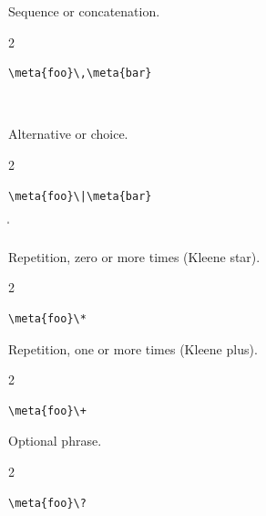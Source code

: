\documentclass{scrartcl}
\begin{document}
{\begin{definition}
\begin{description}
\item[\code{\\,}]
\symindex{\,}
Sequence or concatenation.
\begin{multicols}{2}
\begin{verbatim}
\meta{foo}\,\meta{bar}
\end{verbatim}
\columnbreak
\begin{metasyntax}
\,
\end{metasyntax}
\end{multicols}

\item[\code{\\|}]
\symindex{\|}
Alternative or choice.
\begin{multicols}{2}
\begin{verbatim}
\meta{foo}\|\meta{bar}
\end{verbatim}
\columnbreak
\begin{metasyntax}
\|
\end{metasyntax}
\end{multicols}

\item[\code{\\*}]
\symindex{\*}
Repetition, zero or more times (Kleene star).
\begin{multicols}{2}
\begin{verbatim}
\meta{foo}\*
\end{verbatim}
\columnbreak
\begin{metasyntax}
\*
\end{metasyntax}
\end{multicols}

\item[\code{\\+}]
\symindex{\+}
Repetition, one or more times (Kleene plus).
\begin{multicols}{2}
\begin{verbatim}
\meta{foo}\+
\end{verbatim}
\columnbreak
\begin{metasyntax}
\+
\end{metasyntax}
\end{multicols}

\item[]
\symindex{\?}
Optional phrase.
\begin{multicols}{2}
\begin{verbatim}
\meta{foo}\?
\end{verbatim}
\columnbreak
\begin{metasyntax}
\?
\end{metasyntax}
\end{multicols}


\end{description}
\end{definition}}
\end{document}
